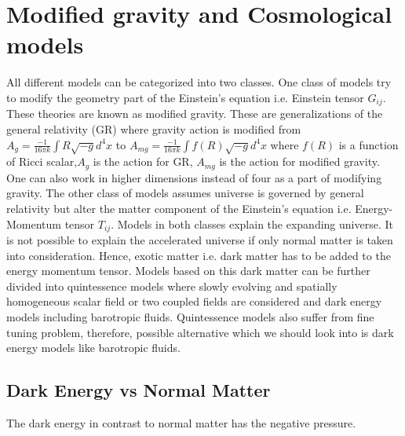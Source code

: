 \section{Modified gravity and Cosmological models}
All different models can be categorized into two classes. One class of models try to modify the geometry part of the Einstein's equation i.e. Einstein tensor $G_{ij}$. These theories are known as modified gravity. These are generalizations of the general relativity (GR) where gravity action is modified from $ A_{g}=\frac{-1}{16 \pi k} \int R \sqrt{-g} d^{4} x$ to $ A_{mg}=\frac{-1}{16 \pi k} \int f(R) \sqrt{-g} d^{4} x$ where $f(R)$ is a function of Ricci scalar,$A_g$ is the action for GR, $A_{mg}$ is the action for modified gravity. One can also work in higher dimensions instead of four as a part of modifying gravity. The other class of models assumes universe is governed by general relativity but alter the matter component of the Einstein's equation i.e. Energy-Momentum tensor $T_{ij}$. Models in both classes explain the expanding universe. It is not possible to explain the accelerated universe if only normal matter is taken into consideration. Hence, exotic matter i.e. dark matter has to be added to the energy momentum tensor. Models based on this dark matter can be further divided into quintessence models where slowly evolving and spatially homogeneous scalar field or two coupled fields are considered and dark energy models including barotropic fluids. Quintessence models also suffer from fine tuning problem, therefore, possible alternative which we should look into is dark energy models like barotropic fluids.\\
\subsection{Dark Energy vs Normal Matter}\label{sec2}
The dark energy in contrast to normal matter has the negative pressure.



